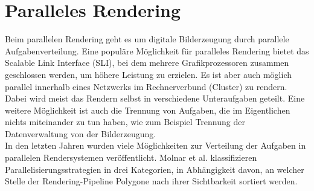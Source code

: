 \section{Paralleles Rendering}
\label{sec:relwork:parrender}
Beim parallelen Rendering geht es um digitale Bilderzeugung durch parallele Aufgabenverteilung. Eine populäre Möglichkeit für paralleles Rendering bietet das Scalable Link Interface (SLI), bei dem mehrere Grafikprozessoren zusammen geschlossen werden, um höhere Leistung zu erzielen. Es ist aber auch möglich parallel innerhalb eines Netzwerks im Rechnerverbund (Cluster) zu rendern. Dabei wird meist das Rendern selbst in verschiedene Unteraufgaben geteilt. Eine weitere Möglichkeit ist auch die Trennung von Aufgaben, die im Eigentlichen nichts miteinander zu tun haben, wie zum Beispiel Trennung der Datenverwaltung von der Bilderzeugung.\\
In den letzten Jahren wurden viele Möglichkeiten zur Verteilung der Aufgaben in parallelen Rendersystemen veröffentlicht. Molnar et al. \cite{molnar} klassifizieren Parallelisierungsstrategien in drei Kategorien, in Abhängigkeit davon, an welcher Stelle der Rendering-Pipeline Polygone nach ihrer Sichtbarkeit sortiert werden.

